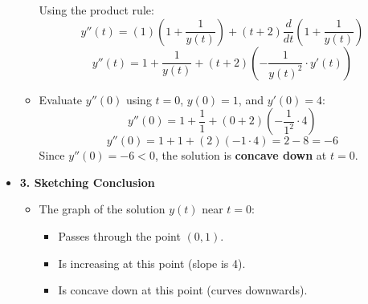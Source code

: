 \begin{cascade}
\begin{itemize}
\begin{itemize}
			            Using the product rule:
			            $$ y''(t) = (1)\left(1 + \frac{1}{y(t)}\right) + (t+2) \frac{d}{dt}\left(1 + \frac{1}{y(t)}\right) $$
			            $$ y''(t) = 1 + \frac{1}{y(t)} + (t+2)\left( -\frac{1}{y(t)^2} \cdot y'(t) \right) $$
			      \item Evaluate $y''(0)$ using $t=0$, $y(0)=1$, and $y'(0)=4$:
			            $$ y''(0) = 1 + \frac{1}{1} + (0+2)\left( -\frac{1}{1^2} \cdot 4 \right) $$
			            $$ y''(0) = 1 + 1 + (2)(-1 \cdot 4) = 2 - 8 = -6 $$
			            Since $y''(0) = -6 < 0$, the solution is \textbf{concave down} at $t=0$.
		      \end{itemize}
		\item \textbf{3. Sketching Conclusion}
		      \begin{itemize}
			      \item The graph of the solution $y(t)$ near $t=0$:
			            \begin{itemize}
				            \item Passes through the point $(0, 1)$.
				            \item Is increasing at this point (slope is 4).
				            \item Is concave down at this point (curves downwards).
			            \end{itemize}
		      \end{itemize}
	\end{itemize}
\end{cascade}

\hfill

